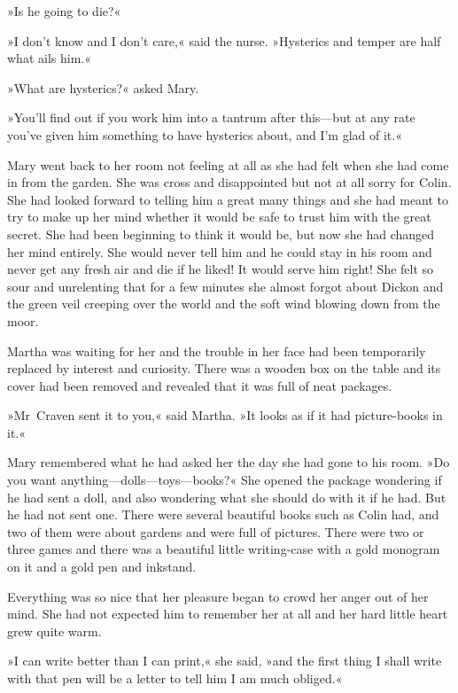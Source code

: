 »Is he going to die?«

»I don't know and I don't care,« said the nurse. »Hysterics and temper are half what ails him.«

»What are hysterics?« asked Mary.

»You'll find out if you work him into a tantrum after this—but at any rate you've given him something to have hysterics about, and I'm glad of it.«

Mary went back to her room not feeling at all as she had felt when she had come in from the garden. She was cross and disappointed but not at all sorry for Colin. She had looked forward to telling him a great many things and she had meant to try to make up her mind whether it would be safe to trust him with the great secret. She had been beginning to think it would be, but now she had changed her mind entirely. She would never tell him and he could stay in his room and never get any fresh air and die if he liked! It would serve him right! She felt so sour and unrelenting that for a few minutes she almost forgot about Dickon and the green veil creeping over the world and the soft wind blowing down from the moor.

Martha was waiting for her and the trouble in her face had been temporarily replaced by interest and curiosity. There was a wooden box on the table and its cover had been removed and revealed that it was full of neat packages.

»Mr~Craven sent it to you,« said Martha. »It looks as if it had picture-books in it.«

Mary remembered what he had asked her the day she had gone to his room. »Do you want anything—dolls—toys—books?« She opened the package wondering if he had sent a doll, and also wondering what she should do with it if he had. But he had not sent one. There were several beautiful books such as Colin had, and two of them were about gardens and were full of pictures. There were two or three games and there was a beautiful little writing-case with a gold monogram on it and a gold pen and inkstand.

Everything was so nice that her pleasure began to crowd her anger out of her mind. She had not expected him to remember her at all and her hard little heart grew quite warm.

»I can write better than I can print,« she said, »and the first thing I shall write with that pen will be a letter to tell him I am much obliged.«

